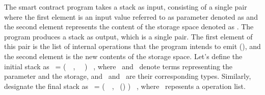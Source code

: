 \documentclass[a4paper,UKenglish,cleveref, autoref, thm-restate]{lipics-v2021}
\begin{document}
The smart contract program takes a stack as input, consisting of a single pair where the first element is an input value referred to as parameter denoted as \VPAR and the second element represents the content of the storage space denoted as \VSTORAGE. The program produces a stack as output, which is a single pair. The first element of this pair is the list of internal operations that the program intends to emit (\VOPERATIONLIST), and the second element is the new contents of the storage space.  Let's define the initial stack as  \SINIT\   = (\KPAIR\ \VPAR\ \VSTORAGE, \TPAIR\ \TYF\ \TYS) \STACKCONCAT\ \EMPTYSTACK, where \VPAR\ and \VSTORAGE\ denote terms representing the parameter and the storage, and \TYF\ and \TYS\ are their corresponding types. Similarly, designate the final stack as \SFINAL\   = (\PAIR\ \VOPERATIONLIST\ \VSTORAGE, \TPAIR\ (\TOPERATIONLIST) \TYS) \STACKCONCAT\ \EMPTYSTACK, where \VOPERATIONLIST\ repesents a operation list.
\end{document}
